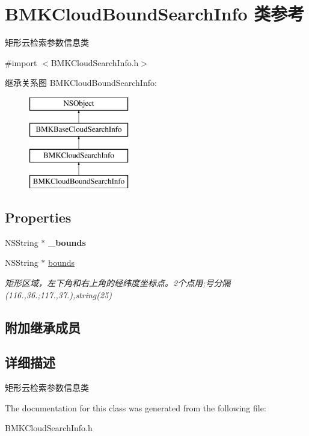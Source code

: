 \hypertarget{interface_b_m_k_cloud_bound_search_info}{\section{B\-M\-K\-Cloud\-Bound\-Search\-Info 类参考}
\label{interface_b_m_k_cloud_bound_search_info}
}


矩形云检索参数信息类  




{\ttfamily \#import $<$B\-M\-K\-Cloud\-Search\-Info.\-h$>$}

继承关系图 B\-M\-K\-Cloud\-Bound\-Search\-Info\-:\begin{figure}[H]
\begin{center}
\leavevmode
\includegraphics[height=4.000000cm]{interface_b_m_k_cloud_bound_search_info}
\end{center}
\end{figure}
\subsection*{Properties}
\begin{DoxyCompactItemize}
\item 
\hypertarget{interface_b_m_k_cloud_bound_search_info_aab508b50d538d64dbd6e45d3280aa1d9}{N\-S\-String $\ast$ {\bfseries \-\_\-bounds}}\label{interface_b_m_k_cloud_bound_search_info_aab508b50d538d64dbd6e45d3280aa1d9}

\item 
\hypertarget{interface_b_m_k_cloud_bound_search_info_a23623d581d1b1e81766d9c46048966cb}{N\-S\-String $\ast$ \hyperlink{interface_b_m_k_cloud_bound_search_info_a23623d581d1b1e81766d9c46048966cb}{bounds}}\label{interface_b_m_k_cloud_bound_search_info_a23623d581d1b1e81766d9c46048966cb}

\begin{DoxyCompactList}\small\item\em 矩形区域，左下角和右上角的经纬度坐标点。2个点用;号分隔(116.,36.;117.,37.),string(25) \end{DoxyCompactList}\end{DoxyCompactItemize}
\subsection*{附加继承成员}


\subsection{详细描述}
矩形云检索参数信息类 

The documentation for this class was generated from the following file\-:\begin{DoxyCompactItemize}
\item 
B\-M\-K\-Cloud\-Search\-Info.\-h\end{DoxyCompactItemize}
